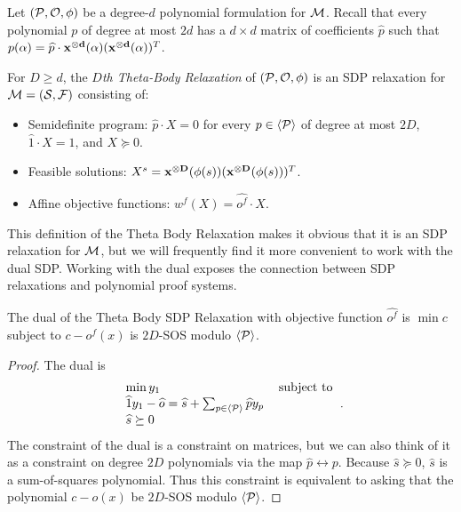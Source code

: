 Let $(\mathcal P, \mathcal O, \phi)$ be a degree-$d$ polynomial formulation for $\mathcal M$. Recall that every polynomial $p$ of degree at most $2d$ has a $d \times d$ matrix of coefficients $\widehat{p}$ such that $p(\alpha) = \widehat{p} \cdot \mathbf{x^{\otimes d}}(\alpha)(\mathbf{x^{\otimes d}}(\alpha))^T$.
\begin{definition}
For $D \geq d$, the \emph{$D$th Theta-Body Relaxation} of $(\mathcal P,\mathcal O,\phi)$ is an SDP relaxation for $\mathcal M = (\mathcal S, \mathcal F)$ consisting of: 
\begin{itemize}
\item Semidefinite program: $\widehat{p} \cdot X = 0$ for every $p \in \langle \mathcal P \rangle$ of degree at most $2D$, $\widehat{1} \cdot X = 1$, and $X \succeq 0$.
\item Feasible solutions: $X^s = \mathbf{x^{\otimes D}}(\phi(s))(\mathbf{x^{\otimes D}}(\phi(s)))^T$.
\item Affine objective functions: $w^f(X) = \widehat{o^f} \cdot X$.
\end{itemize}
\end{definition}
This definition of the Theta Body Relaxation makes it obvious that it is an SDP relaxation for $\mathcal M$, but we will frequently find it more convenient to work with the dual SDP. Working with the dual exposes the connection between SDP relaxations and polynomial proof systems.
\begin{lemma}
The dual of the Theta Body SDP Relaxation with objective function $\widehat{o^f}$ is $\min c$ subject to $c - o^f(x)$ is $2D$-SOS modulo $\langle \mathcal P \rangle$.
\end{lemma}
\begin{proof}
The dual is
\[\begin{tabular}{ll} $\min y_1$ & subject to \\ $\widehat{1}y_1 - \widehat{o} = \widehat{s} + \sum_{p \in \gen{\cP}} \widehat{p}y_p$ \\ $\widehat{s} \succeq 0$\end{tabular}.\]
The constraint of the dual is a constraint on matrices, but we can also think of it as a constraint on degree $2D$ polynomials via the map $\widehat{p} \leftrightarrow p$. Because $\widehat{s} \succeq 0$, $\widehat{s}$ is a sum-of-squares polynomial. Thus this constraint is equivalent to asking that the polynomial $c - o(x)$ be $2D$-SOS modulo $\langle \mathcal P \rangle$.
\end{proof}


